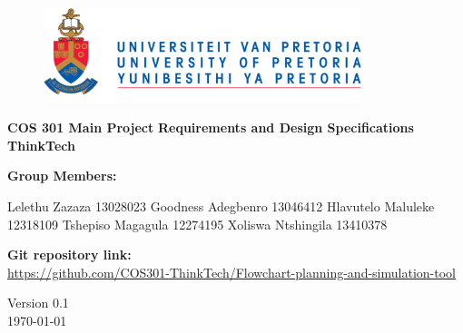\begin{titlepage}
	\begin{center}
		
		\begin{figure}[t]
			\centering
			\includegraphics[width=350px]{UP_Logo.png}
		\end{figure}		
	
	
	\begin{flushright} 
		
		\textbf{\LARGE COS 301 Main Project}
		\newline \newline \newline
		\textbf{\LARGE Requirements and Design Specifications}
		\newline \newline \newline
 		\textbf{\LARGE ThinkTech}
		\newline \newline \newline
	\end{flushright}
		
		\vspace{1 cm}
		
		\LARGE{\textbf{Group Members: }}
		

		\begin{flushright} \large
			Lelethu Zazaza 13028023\newline
			Goodness Adegbenro 13046412\newline
			Hlavutelo Maluleke 12318109\newline
			Tshepiso Magagula 12274195\newline
			Xoliswa Ntshingila 13410378\newline
		\end{flushright}
		
	
		
		\textbf{Git repository link:\\}
		 \url{https://github.com/COS301-ThinkTech/Flowchart-planning-and-simulation-tool}
		
		\vfill
		
		{\LARGE Version 0.1}
		\\
		{\large \today}		
		
		
	\end{center}
\end{titlepage}
